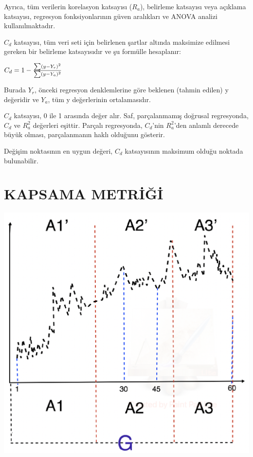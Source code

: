 \documentclass[12pt,twoside]{deuthesis}
\begin{document}
Ayrıca, tüm verilerin korelasyon katsayısı (\(R_{a}\)), belirleme katsayısı veya açıklama katsayısı, regresyon fonksiyonlarının güven aralıkları ve ANOVA analizi kullanılmaktadır.

\(C_{d}\) katsayısı, tüm veri seti için belirlenen şartlar altında maksimize edilmesi gereken bir belirleme katsayısıdır ve şu formülle hesaplanır:

\(C_{d}=1-{\sum (y-Y_{r})^{2} \over \sum (y-Y_{a})^{2}}\)

Burada \(Y_{r}\), önceki regresyon denklemlerine göre beklenen (tahmin edilen) y değeridir ve \(Y_{a}\), tüm y değerlerinin ortalamasıdır.

\(C_{d}\) katsayısı, 0 ile 1 arasında değer alır. Saf, parçalanmamış doğrusal regresyonda, \(C_{d}\) ve \(R_{a}^2\) değerleri eşittir. Parçalı regresyonda, \(C_{d}\)'nin \(R_{a}^2\)'den anlamlı derecede büyük olması, parçalanmanın haklı olduğunu gösterir.

Değişim noktasının en uygun değeri, \(C_{d}\) katsayısının maksimum olduğu noktada bulunabilir.

\hypertarget{kapsama-metriux11fi}{%
\section{KAPSAMA METRİĞİ}\label{kapsama-metriux11fi}}

\includegraphics[width=15.5in]{figure/cover}
\end{document}
